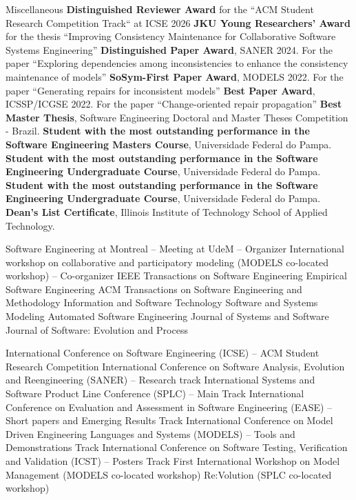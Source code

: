 \begin{rubric}{Miscellaneous}
\entry*[2026]  \textbf{Distinguished Reviewer Award} for the ``ACM Student Research Competition Track`` at ICSE 2026
\entry*[2025] \textbf{JKU Young Researchers' Award} for the thesis ``Improving Consistency Maintenance for Collaborative Software Systems Engineering'' 
\entry*[2024] \textbf{Distinguished Paper Award}, SANER 2024. For the paper ``Exploring dependencies among inconsistencies to enhance the consistency maintenance of models''%
\entry*[2022] \textbf{SoSym-First Paper Award}, MODELS 2022. For the paper ``Generating repairs for inconsistent models''%
\entry*[2022] \textbf{Best Paper Award}, ICSSP/ICGSE 2022. For the paper ``Change-oriented repair propagation''%
\entry*[2021]
\textbf{Best Master Thesis}, Software Engineering Doctoral and Master Theses Competition - Brazil.
\entry*[2019]
\textbf{Student with the most outstanding performance in the Software Engineering Masters Course}, Universidade Federal do Pampa.
\entry*[2018]
\textbf{Student with the most outstanding performance in the Software Engineering Undergraduate Course}, Universidade Federal do Pampa.
\entry*[2016]
\textbf{Student with the most outstanding performance in the Software Engineering Undergraduate Course}, Universidade Federal do Pampa.
\entry*[2014] \textbf{Dean's List Certificate}, Illinois Institute of Technology School of Applied Technology.

\entry*[2025 -- $\cdots$] Software Engineering at Montreal -- Meeting at UdeM -- Organizer
\entry*[2024 -- $\cdots$] International workshop on collaborative and participatory modeling (MODELS co-located workshop) -- Co-organizer
\entry*[2026 -- $\cdots$] IEEE Transactions on Software Engineering
\entry*[2025 -- $\cdots$] Empirical Software Engineering
\entry*[2025 -- $\cdots$] ACM Transactions on Software Engineering and Methodology
\entry*[2025 -- $\cdots$] Information and Software Technology
\entry*[2024 -- $\cdots$] Software and Systems Modeling
\entry*[2024 -- $\cdots$] Automated Software Engineering
\entry*[2023 -- $\cdots$] Journal of Systems and Software
\entry*[2022 -- $\cdots$] Journal of Software: Evolution and Process

\entry*[2026 -- $\cdots$] International Conference on Software Engineering (ICSE) -- ACM Student Research Competition
\entry*[2025 -- $\cdots$] International Conference on Software Analysis, Evolution and Reengineering (SANER) -- Research track
\entry*[2025 -- $\cdots$]  International Systems and Software Product Line Conference (SPLC) -- Main Track
\entry*[2025 -- $\cdots$]  International Conference on Evaluation and Assessment in Software Engineering (EASE) -- Short papers and Emerging Results Track
\entry*[2025 -- $\cdots$]  International Conference on Model Driven Engineering Languages and Systems (MODELS) -- Tools and Demonstrations Track
\entry*[2025 -- $\cdots$] International Conference on Software Testing, Verification and Validation (ICST) -- Posters Track
\entry*[2024 -- $\cdots$] First International Workshop on Model Management (MODELS co-located workshop) 
\entry*[2023 -- $\cdots$] Re:Volution (SPLC co-located workshop)



\end{rubric}
